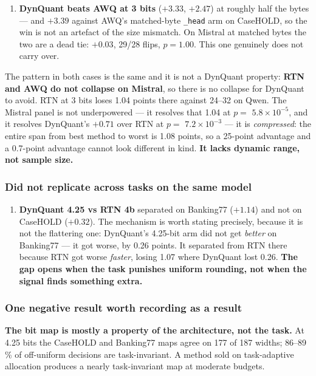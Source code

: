 \documentclass[11pt]{article}
\newcommand{\pct}{\,\%}
\newcommand{\code}[1]{\texttt{#1}}
\newcommand{\e}[2]{$#1\!\times\!10^{#2}$}
\begin{document}
\begin{enumerate}[leftmargin=1.4em,start=5]
\item \textbf{DynQuant beats AWQ at 3 bits} ($+3.33$, $+2.47$) at roughly half the bytes --- and
$+3.39$ against AWQ's matched-byte \code{\_head} arm on CaseHOLD, so the win is not an artefact of
the size mismatch. On Mistral at matched bytes the two are a dead tie: $+0.03$, 29/28 flips,
$p = 1.00$. This one genuinely does not carry over.
\end{enumerate}

The pattern in both cases is the same and it is not a DynQuant property: \textbf{RTN and AWQ do
not collapse on Mistral}, so there is no collapse for DynQuant to avoid. RTN at 3 bits loses 1.04
points there against 24--32 on Qwen. The Mistral panel is not underpowered --- it resolves that
1.04 at $p = $ \e{5.8}{-5}, and it resolves DynQuant's $+0.71$ over RTN at $p = $ \e{7.2}{-3} ---
it is \emph{compressed}: the entire span from best method to worst is 1.08 points, so a 25-point
advantage and a 0.7-point advantage cannot look different in kind. \textbf{It lacks dynamic
range, not sample size.}

\subsubsection*{Did not replicate across tasks on the same model}

\begin{enumerate}[leftmargin=1.4em,start=6]
\item \textbf{DynQuant 4.25 vs RTN 4b} separated on Banking77 ($+1.14$) and not on CaseHOLD
($+0.32$). The mechanism is worth stating precisely, because it is not the flattering one:
DynQuant's 4.25-bit arm did not get \emph{better} on Banking77 --- it got worse, by 0.26 points.
It separated from RTN there because RTN got worse \emph{faster}, losing 1.07 where DynQuant lost
0.26. \textbf{The gap opens when the task punishes uniform rounding, not when the signal finds
something extra.}
\end{enumerate}

\subsubsection*{One negative result worth recording as a result}

\textbf{The bit map is mostly a property of the architecture, not the task.} At 4.25 bits the
CaseHOLD and Banking77 maps agree on 177 of 187 widths; 86--89\pct{} of off-uniform decisions are
task-invariant. A method sold on task-adaptive allocation produces a nearly task-invariant map at
moderate budgets.
\end{document}
